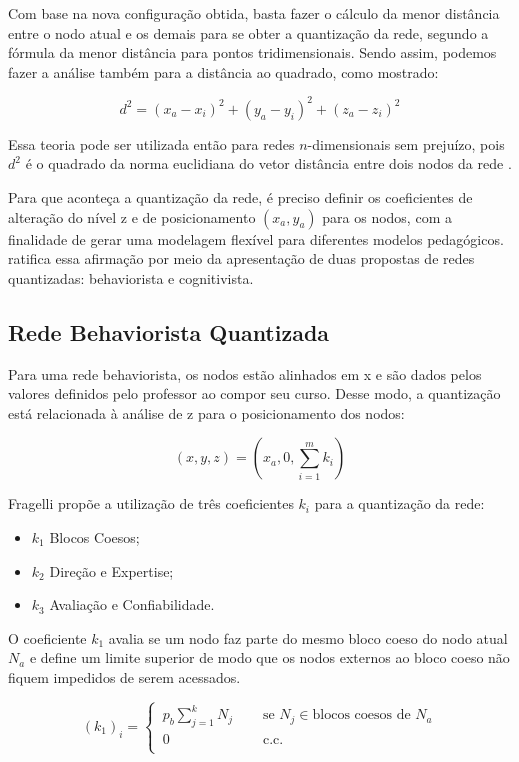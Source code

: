 Com base na nova configuração obtida, basta fazer o cálculo da menor distância entre o nodo atual e os demais para se obter a quantização da rede, segundo a fórmula da menor distância para pontos tridimensionais. Sendo assim, podemos fazer a análise também para a distância ao quadrado, como mostrado:

\begin{equation}
	d^2 = (x_a-x_i)^2 +(y_a-y_i)^2 + (z_a-z_i)^2 
\end{equation}

Essa teoria pode ser utilizada então para redes \(n\)-dimensionais sem prejuízo, pois \(d^2\) é o quadrado da norma euclidiana do vetor distância entre dois nodos da rede \cite{fragelli2010}.

Para que aconteça a quantização da rede, é preciso definir os coeficientes de alteração do nível z e de posicionamento \((x_a,y_a)\) para os nodos, com a finalidade de gerar uma modelagem flexível para diferentes modelos pedagógicos. \cite{fragelli2010} ratifica essa afirmação por meio da apresentação de duas propostas de redes quantizadas: behaviorista e cognitivista.

\subsection{Rede Behaviorista Quantizada}

Para uma rede behaviorista, os nodos estão alinhados em x e são dados pelos valores definidos pelo professor ao compor seu curso. Desse modo, a quantização está relacionada à análise de z para o posicionamento dos nodos:

\begin{equation}
	(x,y,z)=(x_a,0,\sum_{i=1}^{m} k_i ) 
\end{equation}

Fragelli propõe a utilização de três coeficientes \(k_i\) para a quantização da rede:

\begin{itemize}
	\item \(k_1\) Blocos Coesos;
 	\item \(k_2\) Direção e Expertise;
 	\item \(k_3\) Avaliação e Confiabilidade.
\end{itemize}

O coeficiente \(k_1\) avalia se um nodo faz parte do mesmo bloco coeso do nodo atual \(N_a\) e define um limite superior de modo que os nodos externos ao bloco coeso não fiquem impedidos de serem acessados.

\[
	(k_1)_i =	\left\{
	\begin{array}{ll}
	    \, p_b \sum_{j=1}^{k} N_j & \quad \text{ se } N_j \in \text{blocos coesos de } N_a  \\
		\, 0  & \quad \text{ c.c. } \\
  	\end{array}
  	\right.
\]
